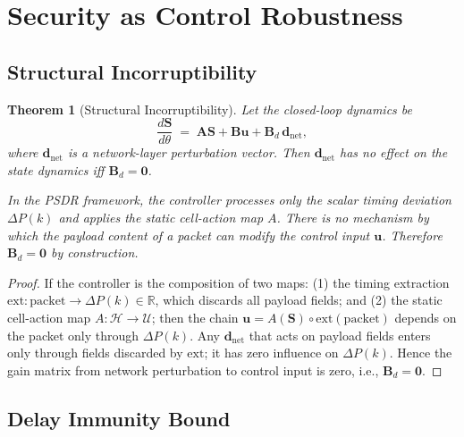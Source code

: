 \documentclass[10pt,twocolumn]{article}
\theoremstyle{plain}
\newtheorem{theorem}{Theorem}[section]
\theoremstyle{definition}
\theoremstyle{remark}
\newcommand{\R}{\mathbb{R}}
\newcommand{\Hcal}{\mathcal{H}}
\newcommand{\Ucal}{\mathcal{U}}
\newcommand{\DeltaP}{\Delta P}
\begin{document}
\section{Security as Control Robustness}
\label{sec:security}

\subsection{Structural Incorruptibility}
\label{ssec:incorr}

\begin{theorem}[Structural Incorruptibility]
\label{thm:incorr}
Let the closed-loop dynamics be
\begin{equation}
  \frac{d\mathbf{S}}{d\theta}
  \;=\; \mathbf{A}\mathbf{S} + \mathbf{B}\mathbf{u}
       + \mathbf{B}_d\,\mathbf{d}_{\mathrm{net}},
  \label{eq:incorr_dyn}
\end{equation}
where $\mathbf{d}_{\mathrm{net}}$ is a network-layer perturbation
vector.  Then $\mathbf{d}_{\mathrm{net}}$ has no effect on the state
dynamics iff $\mathbf{B}_d = \mathbf{0}$.

In the PSDR framework, the controller processes only the scalar timing
deviation $\DeltaP(k)$ and applies the static cell-action map $A$.
There is no mechanism by which the \emph{payload} content of a packet
can modify the control input $\mathbf{u}$.  Therefore $\mathbf{B}_d = \mathbf{0}$
\emph{by construction}.
\end{theorem}

\begin{proof}
If the controller is the composition of two maps: (1) the timing
extraction $\mathrm{ext}: \text{packet} \to \DeltaP(k) \in \R$, which
discards all payload fields; and (2) the static cell-action map
$A: \Hcal \to \Ucal$; then the chain
$\mathbf{u} = A(\mathbf{S}) \circ \mathrm{ext}(\text{packet})$
depends on the packet only through $\DeltaP(k)$.  Any
$\mathbf{d}_{\mathrm{net}}$ that acts on payload fields enters only
through fields discarded by $\mathrm{ext}$; it has zero influence on
$\DeltaP(k)$.  Hence the gain matrix from network perturbation to
control input is zero, i.e., $\mathbf{B}_d = \mathbf{0}$.
\end{proof}

\subsection{Delay Immunity Bound}
\label{ssec:delay}
\end{document}
